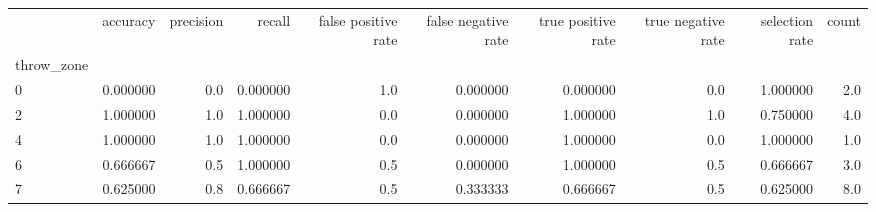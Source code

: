 \begin{tabular}{lrrrrrrrrr}
\toprule
{} &  accuracy &  precision &    recall &  false positive rate &  false negative rate &  true positive rate &  true negative rate &  selection rate &  count \\
throw\_zone &           &            &           &                      &                      &                     &                     &                 &        \\
\midrule
0          &  0.000000 &        0.0 &  0.000000 &                  1.0 &             0.000000 &            0.000000 &                 0.0 &        1.000000 &    2.0 \\
2          &  1.000000 &        1.0 &  1.000000 &                  0.0 &             0.000000 &            1.000000 &                 1.0 &        0.750000 &    4.0 \\
4          &  1.000000 &        1.0 &  1.000000 &                  0.0 &             0.000000 &            1.000000 &                 0.0 &        1.000000 &    1.0 \\
6          &  0.666667 &        0.5 &  1.000000 &                  0.5 &             0.000000 &            1.000000 &                 0.5 &        0.666667 &    3.0 \\
7          &  0.625000 &        0.8 &  0.666667 &                  0.5 &             0.333333 &            0.666667 &                 0.5 &        0.625000 &    8.0 \\
\bottomrule
\end{tabular}
